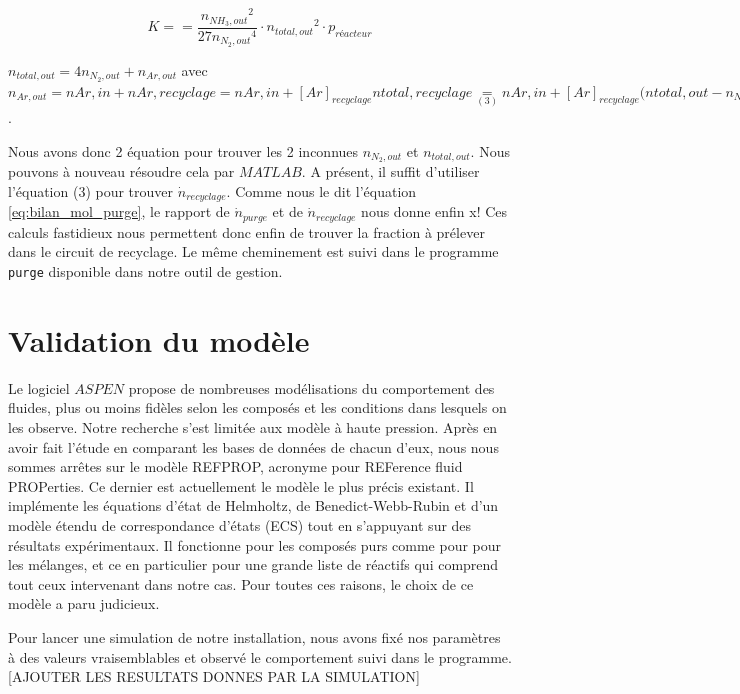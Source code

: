 \documentclass[a4paper, oneside, 12pt]{article}
\begin{document}
\[ K==\frac{{n_{NH_3,out}}^2}{27{n_{N_2,out}}^4}\cdot {n_{total,out}}^2\cdot p_{réacteur} \]

$n_{total,out}=4n_{N_2,out}+n_{Ar,out}$ 
avec $n_{Ar,out}=n{Ar,in}+n{Ar,recyclage}=n{Ar,in}+[Ar]_{recyclage}n{total,recyclage}\underset{(3)}=n{Ar,in}+[Ar]_{recyclage}(n{total,out}-n_{NH_3,out}$.

Nous avons donc 2 équation pour trouver les 2 inconnues $n_{N_2,out}$ et $n_{total,out}$. 
Nous pouvons à nouveau résoudre cela par $MATLAB$. 
A présent, il suffit d'utiliser l'équation (3) pour trouver $\dot{n}_{recyclage}$. 
Comme nous le dit l'équation \ref{eq:bilan_mol_purge}, le rapport de $\dot{n}_{purge}$ 
et de $\dot{n}_{recyclage}$ nous donne enfin x! 
Ces calculs fastidieux nous permettent donc enfin de trouver la fraction à prélever 
dans le circuit de recyclage. 
Le même cheminement est suivi dans le programme \texttt{purge} disponible dans notre outil de gestion.

\section{Validation du modèle}

Le logiciel $ASPEN$ propose de nombreuses modélisations du comportement des fluides, 
plus ou moins fidèles selon les composés et les conditions dans lesquels on les observe. 
Notre recherche s'est limitée aux modèle à haute pression. 
Après en avoir fait l'étude en comparant les bases de données de chacun d'eux, 
nous nous sommes arrêtes sur le modèle REFPROP, acronyme pour REFerence fluid PROPerties. 
Ce dernier est actuellement le modèle le plus précis existant. 
Il implémente les équations d'état de Helmholtz, de Benedict-Webb-Rubin 
et d'un modèle étendu de correspondance d'états (ECS) tout en s'appuyant sur des résultats expérimentaux. 
Il fonctionne pour les composés purs comme pour pour les mélanges, 
et ce en particulier pour une grande liste de réactifs qui comprend tout ceux intervenant dans notre cas. 
Pour toutes ces raisons, le choix de ce modèle a paru judicieux.

Pour lancer une simulation de notre installation, 
nous avons fixé nos paramètres à des valeurs vraisemblables 
et observé le comportement suivi dans le programme. 
[AJOUTER LES RESULTATS DONNES PAR LA SIMULATION]
\end{document}
